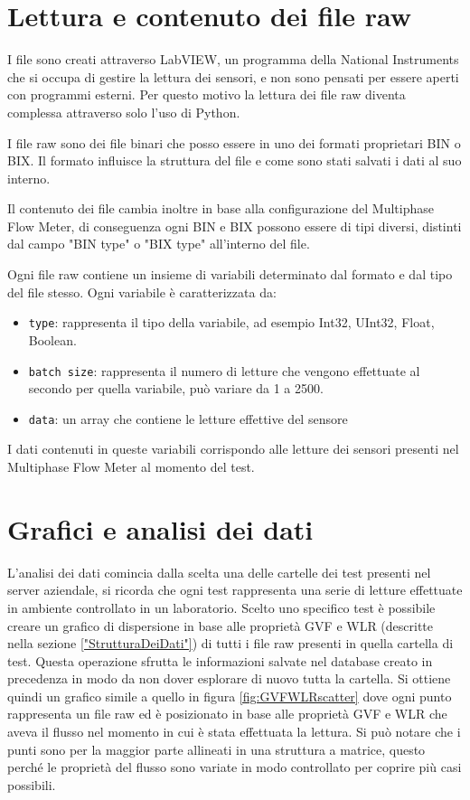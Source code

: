 \section{Lettura e contenuto dei file raw}
I file sono creati attraverso LabVIEW, un programma della National Instruments che si occupa di gestire la lettura dei sensori, e non sono pensati per essere aperti con programmi esterni. Per questo motivo la lettura dei file raw diventa complessa attraverso solo l'uso di Python.

I file raw sono dei file binari che posso essere in uno dei formati proprietari BIN o BIX. Il formato influisce la struttura del file e come sono stati salvati i dati al suo interno.

Il contenuto dei file cambia inoltre in base alla configurazione del Multiphase Flow Meter, di conseguenza ogni BIN e BIX possono essere di tipi diversi, distinti dal campo "BIN type" o "BIX type" all'interno del file.

Ogni file raw contiene un insieme di variabili determinato dal formato e dal tipo del file stesso. Ogni variabile è caratterizzata da:
\begin{itemize}
	\item \texttt{type}: rappresenta il tipo della variabile, ad esempio Int32, UInt32, Float, Boolean.
	\item \texttt{batch size}: rappresenta il numero di letture che vengono effettuate al secondo per quella variabile, può variare da 1 a 2500.
	\item \texttt{data}: un array che contiene le letture effettive del sensore
\end{itemize}

I dati contenuti in queste variabili corrispondo alle letture dei sensori presenti nel Multiphase Flow Meter al momento del test.

\section{Grafici e analisi dei dati}

L'analisi dei dati comincia dalla scelta una delle cartelle dei test presenti nel server aziendale, si ricorda che ogni test rappresenta una serie di letture effettuate in ambiente controllato in un laboratorio. Scelto uno specifico test è possibile creare un grafico di dispersione in base alle proprietà GVF e WLR (descritte nella sezione \ref{"StrutturaDeiDati"}) di tutti i file raw presenti in quella cartella di test. Questa operazione sfrutta le informazioni salvate nel database creato in precedenza in modo da non dover esplorare di nuovo tutta la cartella.
Si ottiene quindi un grafico simile a quello in figura \ref{fig:GVFWLRscatter} dove ogni punto rappresenta un file raw ed è posizionato in base alle proprietà GVF e WLR che aveva il flusso nel momento in cui è stata effettuata la lettura. Si può notare che i punti sono per la maggior parte allineati in una struttura a matrice, questo perché le proprietà del flusso sono variate in modo controllato per coprire più casi possibili. 

